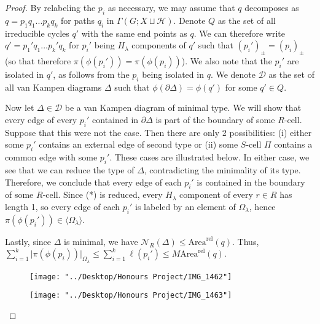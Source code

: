 \documentclass[12pt]{article}
\newcommand{\vs}{\vskip10pt}
\begin{document}
	\begin{proof}
		
		By relabeling the $p_i$ as necessary, we may assume that $q$ decomposes as $q = p_1 q_1 ... p_k q_k$ for paths $q_i$ in $\Gamma(G; X \sqcup \mathcal{H})$. Denote $Q$ as the set of all irreducible cycles $q'$ with the same end points as $q$. We can therefore write $q' = p_1'q_1...p_k' q_k$ for $p_i'$ being $H_{\lambda}$ components of $q'$ such that $(p_i')_{\pm} = (p_i)_{\pm}$ (so that therefore $\pi(\phi(p_i')) = \pi(\phi(p_i))$). We also note that the $p_i'$ are isolated in $q'$, as follows from the $p_i$ being isolated in $q$. We denote $\mathcal{D}$ as the set of all van Kampen diagrams $\Delta$ such that $\phi(\partial \Delta) = \phi(q')$ for some $q' \in Q$. 
		
		\vs 
		
		Now let $\Delta \in \mathcal{D}$ be a van Kampen diagram of minimal type. We will show that every edge of every $p_i'$ contained in $\partial \Delta$ is part of the boundary of some $R$-cell. Suppose that this were not the case. Then there are only 2 possibilities: (i) either some $p_i'$ contains an external edge of second type or (ii) some $S$-cell $\Pi$ contains a common edge with some $p_i'$. These cases are illustrated below. In either case, we see that we can reduce the type of $\Delta$, contradicting the minimality of its type. Therefore, we conclude that every edge of each $p_i'$ is contained in the boundary of some $R$-cell. Since (*) is reduced, every $H_{\lambda}$ component of every $r \in R$ has length 1, so every edge of each $p_i'$ is labeled by an element of $\Omega_{\lambda}$, hence $\pi(\phi(p_i')) \in \langle \Omega_{\lambda} \rangle$. 
		
		\vs 
		
		Lastly, since $\Delta$ is minimal, we have $\mathcal{N}_R(\Delta) \leq \text{Area}^{\text{rel}}(q)$. Thus, $\sum_{i=1}^k \vert \pi(\phi(p_i)) \vert_{\Omega_{\lambda}} \leq \sum_{i=1}^k \ell(p_i') \leq M \text{Area}^{\text{rel}}(q)$.
		
\begin{figure} [h]
	\centering
	\texttt{[image: "../Desktop/Honours Project/IMG\_1462"]}
	\caption{}
	\label{fig:img1462}
\end{figure}

\begin{figure} [h]
	\centering
	\texttt{[image: "../Desktop/Honours Project/IMG\_1463"]}
	\caption{}
	\label{fig:img1463}
\end{figure}

		
	\end{proof}  
\end{document}
